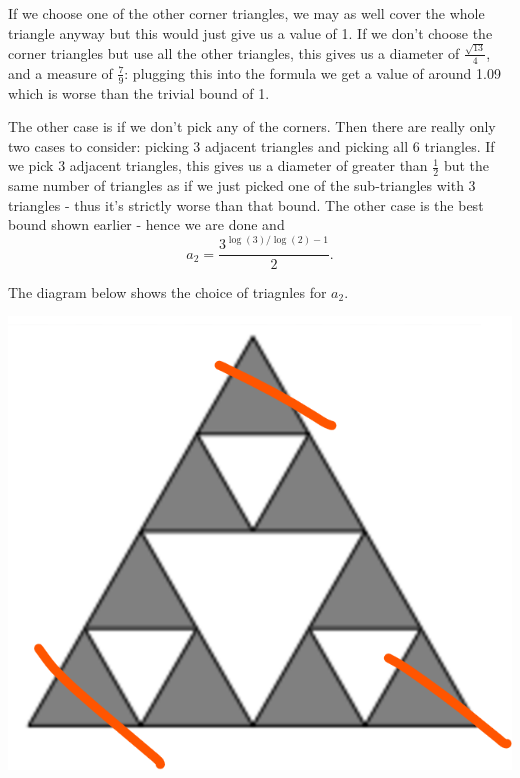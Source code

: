 If we choose one of the other corner triangles, we may as well cover the whole triangle anyway but this would just give us a value of 1. If we don't choose the corner triangles but use all the other triangles, this gives us a diameter of \(\frac{\sqrt{13}}{4}\), and a measure of \(\frac{7}{9}\): plugging this into the formula we get a value of around 1.09 which is worse than the trivial bound of 1.

The other case is if we don't pick any of the corners. Then there are really only two cases to consider: picking 3 adjacent triangles and picking all 6 triangles. If we pick 3 adjacent triangles, this gives us a diameter of greater than \(\frac{1}{2}\) but the same number of triangles as if we just picked one of the sub-triangles with 3 triangles - thus it's strictly worse than that bound. The other case is the best bound shown earlier - hence we are done and
\[a_2 = \frac{3^{\log(3)/\log(2) - 1}}{2}.\]

The diagram below shows the choice of triagnles for \(a_2\).

\begin{center}
    \includegraphics[width=0.5\linewidth]{solutions/section-5-0/diag-5-0-2.png}
\end{center}